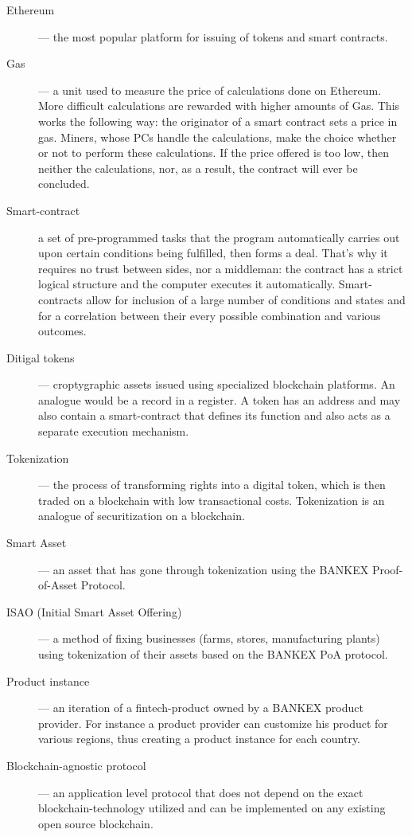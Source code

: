 \documentclass{article}
\begin{document}
\begin{description}
\item[Ethereum]--- the most popular platform for issuing of tokens and smart contracts. 
\item[Gas]--- a unit used to measure the price of calculations done on Ethereum. More difficult calculations are rewarded with higher amounts of Gas. This works the following way: the originator of a smart contract sets a price in gas. Miners, whose PCs handle the calculations, make the choice whether or not to perform these calculations. If the price offered is too low, then neither the calculations, nor, as a result, the contract will ever be concluded. 
\item[Smart-contract] a set of pre-programmed tasks that the program automatically carries out upon certain conditions being fulfilled, then forms a deal. That’s why it requires no trust between sides, nor a middleman: the contract has a strict logical structure and the computer executes it automatically. Smart-contracts allow for inclusion of a large number of conditions and states and for a correlation between their every possible combination and various outcomes. 
\item[Ditigal tokens]--- croptygraphic assets issued using specialized blockchain platforms. An analogue would be a record in a register. A token has an address and may also contain a smart-contract that defines its function and also acts as a separate execution mechanism. 
\item[Tokenization]--- the process of transforming rights into a digital token, which is then traded on a blockchain with low transactional costs. Tokenization is an analogue of securitization on a blockchain. 
\item[Smart Asset]--- an asset that has gone through tokenization using the BANKEX Proof-of-Asset Protocol. 
\item[ISAO (Initial Smart Asset Offering)]--- a method of fixing businesses (farms, stores, manufacturing plants) using tokenization of their assets based on the BANKEX PoA protocol. 
\item[Product instance]--- an iteration of a fintech-product owned by a BANKEX product provider. For instance a product provider can customize his product for various regions, thus creating a product instance for each country. 
\item[Blockchain-agnostic protocol]--- an application level protocol that does not depend on the exact blockchain-technology utilized and can be implemented on any existing open source blockchain. 
\end{description}

\printbibliography
\end{document}
